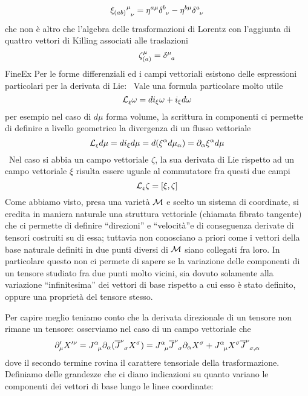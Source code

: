 $$
\Mat{\xi_{(ab)}}{\mu}{\nu}=\eta^{a\mu}\Mat{\delta}{b}{\nu}-\eta^{b\mu}\Mat{\delta}{a}{\nu}
$$
che non \`e altro che l'algebra delle trasformazioni di Lorentz con l'aggiunta di quattro vettori di Killing associati alle traslazioni 
$$
\zeta_{(a)}^\mu=\Mat{\delta}{\mu}{a}
$$
FineEx
Per le forme differenziali ed i campi vettoriali esistono delle espressioni particolari per la derivata di Lie:
\ Vale una formula particolare molto utile
$$
{\cal L}_{\scriptscriptstyle\xi}{\omega}=di_\xi\omega+i_\xi d\omega
$$
per esempio nel caso di $d\mu$ forma volume, la scrittura in componenti ci permette di definire a livello geometrico la divergenza di un flusso vettoriale
$$
{\cal L}_{\scriptscriptstyle\xi}{d\mu}=di_\xi d\mu=d(\xi^\alpha d\mu_\alpha)=\partial_\alpha\xi^\alpha d\mu
$$
\ Nel caso si abbia un campo vettoriale $\zeta$, la sua derivata di Lie rispetto ad un campo vettoriale $\xi$ risulta essere uguale al commutatore fra questi due campi
$$
{\cal L}_{\scriptscriptstyle\xi}{\zeta}=\left[\xi,\zeta\right]
$$
%
%
%
Come abbiamo visto, presa una variet\`a ${\cal M}$ e  scelto un sistema di coordinate, si eredita in maniera naturale una struttura vettoriale (chiamata fibrato tangente) che ci permette di definire ``direzioni'' e ``velocit\`a''e di conseguenza derivate di tensori costruiti su di essa; tuttavia non conosciano a priori come i vettori della base naturale definiti in due punti diversi di ${\cal M}$ siano collegati fra loro. In particolare questo non ci permete di sapere se la variazione delle componenti di un tensore studiato fra due punti molto vicini, sia dovuto solamente alla variazione ``infinitesima'' dei vettori di base rispetto a cui esso \`e stato definito, oppure una propriet\`a del tensore stesso.
\par
 Per capire meglio teniamo conto che la derivata direzionale di  un  tensore non rimane un tensore: osserviamo nel caso di un campo vettoriale che 
$$
\partial^\prime_\mu X^{\prime\nu}=\Mat{J}{\alpha}{\mu}\PT{\alpha}(\Mat{\overline{J}}{\nu}{\sigma}X^\sigma)=\Mat{J}{\alpha}{\mu}\Mat{\overline J}{\nu}{\sigma}\PT{\alpha}X^\sigma+\Mat{J}{\alpha}{\mu}X^\sigma\Mat{\overline J}{\nu}{\sigma,\alpha}
$$
dove il secondo termine rovina il carattere tensoriale della trasformazione.
Definiamo delle grandezze che ci diano indicazioni su quanto variano le componenti dei vettori di base lungo le linee coordinate:
